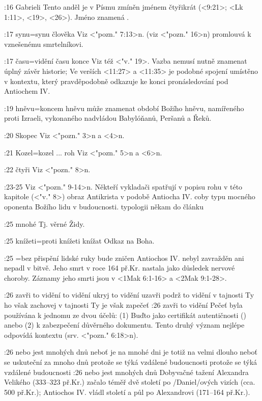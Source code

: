 :16 {Gabrieli} Tento anděl je v Písmu zmíněn jménem čtyřikrát (<9:21>; <Lk 1:11>, <19>, <26>). Jméno znamená .

:17 {synu}={synu člověka} Viz <"pozn." 7:13>n.  (viz <"pozn." 16>n) promlouvá k vznešenému smrtelníkovi. 

:17 {času}={vidění času konce} Viz též <"v." 19>. Vazba nemusí nutně znamenat úplný závěr historie; Ve verších <11:27> a <11:35> je podobné spojení umístěno v kontextu, který pravděpodobně odkazuje ke konci pronásledování pod Antiochem IV.

:19 {hněvu}={koncem hněvu}  může znamenat období Božího hněvu, namířeného proti   Izraeli, vykonaného nadvládou Babylóňanů, Peršanů a Řeků. 

:20 {Skopec} Viz <"pozn." 3>n a <4>n.

:21 {Kozel}={kozel ... roh} Viz <"pozn." 5>n a <6>n.

:22 {čtyři} Viz  <"pozn." 8>n.

:23-25 {} Viz  <"pozn." 9-14>n. Někteří vykladači spatřují v popisu rohu v této kapitole (<"v." 8>)
obraz Antikrista v podobě Antiocha IV. coby typu mocného oponenta Božího lidu v budoucnosti.  
\dopsat typologii někam do článku

:25 {mnohé} Tj. věrné Židy.

:25 {knížeti}={proti knížeti knížat} Odkaz na Boha.

:25 {}={bez přispění lidské ruky bude zničen} Antiochos IV. nebyl zavražděn ani nepadl v bitvě. Jeho smrt v roce 164 př.Kr. nastala jako důsledek nervové choroby. Záznamy jeho smrti jsou v <1Mak 6:1-16> a <2Mak 9:1-28>.

:26 {zavři to vidění} %
    {to vidění ukryj}  %
    {to vidění uzavři}  %
    {podrž to vidění v tajnosti}  %
    {Ty ho však zachovej v tajnosti}  %
    {Ty je však zapečeť}  %
:26 {zavři to vidění} Pečeť byla používána k jednomu ze dvou účelů: (1) Buďto jako certifikát autentičnosti () anebo (2) k zabezpečení  důvěrného dokumentu. Tento druhý význam nejlépe odpovídá kontextu (srv. <"pozn." 6:18>n).


:26 {nebo jest mnohých dnů}    {neboť je na mnohé dni}      {je totiž na velmi dlouho}      {neboť se uskuteční za mnoho dnů}      {protože se týká vzdálené budoucnosti}      {protože se týká vzdálené budoucnosti}    
:26 {nebo jest mnohých dnů} Dobyvačné tažení Alexandra Velikého (333--323 př.Kr.) začalo téměř dvě století po \x/Daniel/ových vizích (cca. 500 př.Kr.); Antiochos IV. vládl století a půl po Alexandrovi (171--164 př.Kr.). 

